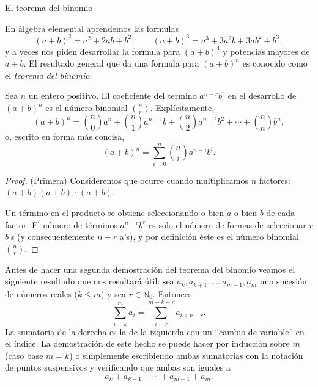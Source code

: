 \begin{section}{El teorema del binomio}\label{seccion-teorema-del-binomio}

En álgebra elemental aprendemos las formulas
$$
(a+b)^2 = a^2 +2ab +b^2, \qquad (a+b)^3 = a^3 + 3 a^2b +3ab^2 +
b^3,
$$
y a veces nos piden desarrollar la formula para $(a+b)^4$ y potencias mayores de $a+b$. El resultado general que da una formula para $(a+b)^n$ es conocido como el  \textit{{teorema del binomio}}.  

\begin{teorema}\label{t3.6}
Sea $n$ un entero positivo. El coeficiente del termino $a^{n-r}b^r$ en el desarrollo de $(a+b)^n$ es el número binomial $\binom{n}{r}$. Explícitamente, 
\begin{equation*}
(a+b)^n= \binom{n}{0} a^n + \binom{n}{1} a^{n-1}b+ \binom{n}{2}
a^{n-2}b^2 + \cdots + \binom{n}{n} b^n,
\end{equation*}
o,  escrito en forma más concisa, 
\begin{equation}\label{eq-th-bin-1}
(a+b)^n= \sum_{i=0}^{n}\binom{n}{i} a^{n-i}b^i.
\end{equation}

\end{teorema}
\begin{proof}(Primera) Consideremos que ocurre cuando multiplicamos $n$ factores: $(a+b)(a+b) \cdots (a+b)$.

Un término en el producto se obtiene seleccionando o bien $a$ o bien $ b$ de cada factor. El número de términos $a^{n-r}b^r$ es solo el número de formas de seleccionar $r$ $b$'s (y consecuentemente $n-r$ a's), y por definición éste es el número binomial $\binom{n}{r}$.
\end{proof}


\begin{observacion}\label{cvar} Antes de hacer una segunda demostración del teorema del binomio veamos el siguiente resultado que nos resultará útil: sea $a_k,a_{k+1},\ldots,a_{m-1},a_m$ una sucesión de números reales ($k \le m$) y sea $r \in \mathbb N_0$.  Entonces
$$
\sum_{i=k}^m a_i = \sum_{i=r}^{m-k+r} a_{i+k-r}.
$$ 
La sumatoria de la derecha es la de la izquierda con un ``cambio de variable'' en el índice. La demostración de este hecho se puede hacer por inducción sobre $m$ (caso base $m=k$) o simplemente escribiendo ambas sumatorias con la notación de puntos suspensivos y verificando que ambas son iguales a
$$
a_k+a_{k+1}+\cdots+a_{m-1}+a_m.
$$  
\end{observacion}



\end{section}
